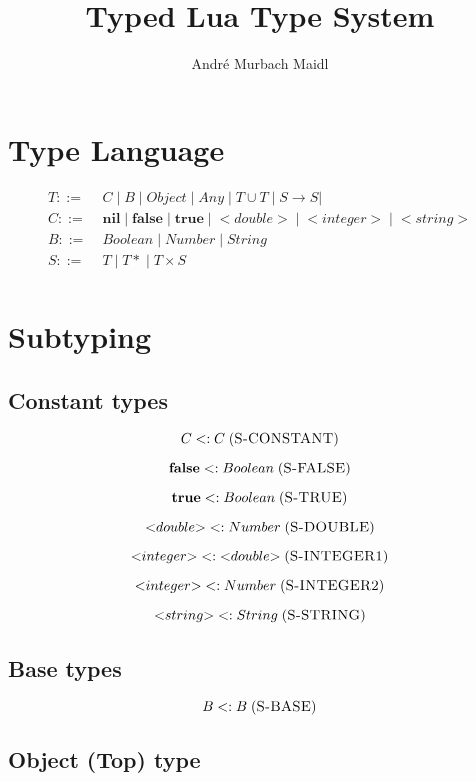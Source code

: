 \documentclass[12pt]{article}
\title{Typed Lua Type System}
\author{André Murbach Maidl}
\newcommand{\mylabel}[1]{\; (\textsc{#1})}
\newcommand{\subtype}{<:}
\newcommand{\pipe}{|\;}
\begin{document}
\maketitle

\section{Type Language}

\begin{align*}
T ::= \; & C \; \pipe B \; \pipe Object \; \pipe Any \; \pipe
T \cup T \; \pipe S \rightarrow S \pipe \\
C ::= \; & \mathbf{nil} \; \pipe \mathbf{false} \; \pipe \mathbf{true} \;
\pipe {<}double{>} \; \pipe {<}integer{>} \; \pipe {<}string{>}\\
B ::= \; & Boolean \; \pipe Number \; \pipe String\\
S ::= \; & T \; \pipe {T*} \; \pipe T \times S\\ 
\end{align*}

\section{Subtyping}

\subsection{Constant types}

\[
C \subtype C
\mylabel{S-CONSTANT}
\]

\[
\mathbf{false} \subtype Boolean
\mylabel{S-FALSE}
\]

\[
\mathbf{true} \subtype Boolean
\mylabel{S-TRUE}
\]

\[
{<}double{>} \subtype Number
\mylabel{S-DOUBLE}
\]

\[
{<}integer{>} \subtype {<}double{>}
\mylabel{S-INTEGER1}
\]

\[
{<}integer{>} \subtype Number
\mylabel{S-INTEGER2}
\]

\[
{<}string{>} \subtype String
\mylabel{S-STRING}
\]

\subsection{Base types}

\[
B \subtype B
\mylabel{S-BASE}
\]

\subsection{Object (Top) type}
\end{document}
